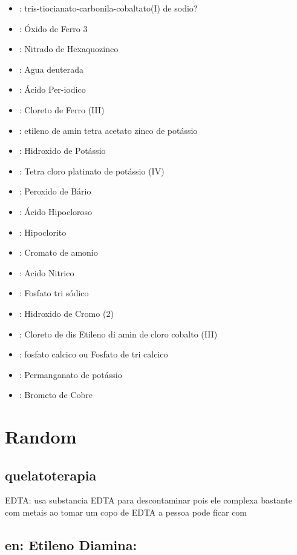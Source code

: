 \documentclass[12pt]{article}
\begin{document}
\begin{itemize}
\item {}: tris-tiocianato-carbonila-cobaltato(I) de sodio?
\item {}: Óxido de Ferro 3
\item {}: Nitrado de Hexaquozinco
\item {}: Agua deuterada %
\item {}: Ácido Per-iodico
\item {}: Cloreto de Ferro (III)
\item {}: etileno de amin tetra acetato zinco de potássio %
\item {}: Hidroxido de Potássio
\item {}: Tetra cloro platinato de potássio (IV)
\item {}: Peroxido de Bário
\item {}: Ácido Hipocloroso
\item {}: Hipoclorito
\item {}: Cromato de amonio 
\item {}: Acido Nitrico
\item {}: Fosfato tri sódico
\item {}: Hidroxido de Cromo (2)
\item {}: Cloreto de dis Etileno di amin de cloro cobalto (III)
\item {}: fosfato calcico ou Fosfato de tri calcico
\item {}: Permanganato de potássio
\item {}: Brometo de Cobre
\end{itemize}

\section{Random}
\subsection{quelatoterapia}
EDTA: 
usa substancia EDTA para descontaminar pois ele complexa bastante com metais
ao tomar um copo de EDTA a pessoa pode ficar com

\subsection{en: Etileno Diamina:  }
\end{document}
